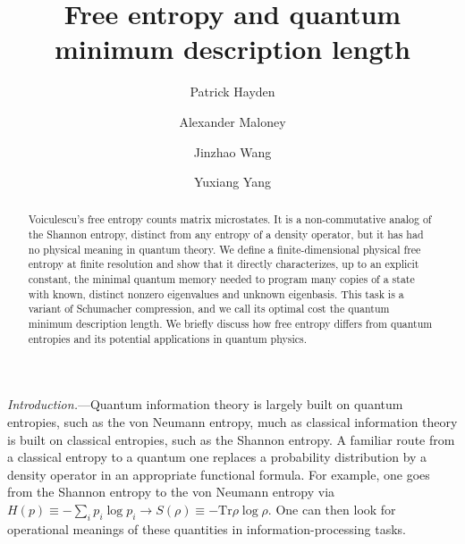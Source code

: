 \documentclass[aps,prl,twocolumn,superscriptaddress,amsmath,amssymb,reprint,longbibliography]{revtex4-2}
\newcommand*{\Tr}{\mathrm{Tr}}
\begin{document}
\title{Free entropy and quantum minimum description length}
\author{Patrick Hayden}
 \author{Alexander Maloney}
\author{Jinzhao Wang}

\author{Yuxiang Yang}

 
\begin{abstract}
Voiculescu's free entropy counts matrix microstates. It is a non-commutative analog of the Shannon entropy, distinct from any entropy of a density operator, but it has had no physical meaning in quantum theory. We define a finite-dimensional physical free entropy at finite resolution and show that it directly characterizes, up to an explicit constant, the minimal quantum memory needed to program many copies of a state with known, distinct nonzero eigenvalues and unknown eigenbasis. This task is a variant of Schumacher compression, and we call its optimal cost the quantum minimum description length. We briefly discuss how free entropy differs from quantum entropies and its potential applications in quantum
physics.
\end{abstract}



\maketitle


\emph{Introduction.}---Quantum information theory is largely built on quantum entropies, such as the von Neumann entropy, much as classical information theory is built on classical entropies, such as the Shannon entropy. A familiar route from a classical entropy to a quantum one replaces a probability distribution by a density operator in an appropriate functional formula. For example, one goes from the Shannon entropy to the von Neumann entropy via $H( p)\equiv-\sum_i p_i\log p_i\rightarrow S(\rho) \equiv -\Tr \rho\log \rho.$ One can then look for operational meanings of these quantities in information-processing tasks.
\end{document}
